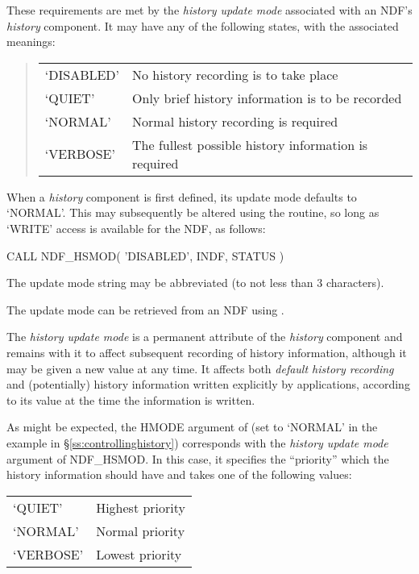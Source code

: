 \documentclass[twoside,11pt,nolof]{starlink}
\providecommand{\st}[1]{{\emph{#1}}}
\begin{document}
These requirements are met by the \st{history update mode\/} associated
with an NDF's \st{history\/} component. It may have any of the
following states, with the associated meanings:

\begin{quote}
\begin{center}
\begin{tabular}{ll}
`DISABLED' & No history recording is to take place\\
`QUIET' & Only brief history information is to be recorded\\
`NORMAL' & Normal history recording is required\\
`VERBOSE' & The fullest possible history information is required
\end{tabular}
\end{center}
\end{quote}

When a \st{history\/} component is first defined, its update mode
defaults to `NORMAL'. This may subsequently be altered using the
 routine, so long as `WRITE' access is available for the
NDF, as follows:

\small
\begin{terminalv}
      CALL NDF_HSMOD( 'DISABLED', INDF, STATUS )
\end{terminalv}
\normalsize

The update mode string may be abbreviated (to not less than 3 characters).

The update mode can be retrieved from an NDF using
.

The \st{history update mode\/} is a permanent attribute of the
\st{history\/} component and remains with it to affect subsequent
recording
of history information, although it may be given a new value at any
time.  It affects both \st{default history recording\/} and (potentially)
history information written explicitly by applications, according to
its value at the time the information is written.

As might be expected, the HMODE argument of  (set to `NORMAL'
in the example in \S\ref{ss:controllinghistory}) corresponds with the
\st{history update mode\/} argument of NDF\_HSMOD. In this case, it
specifies the ``priority'' which the history information should have
and takes one of the following values:

\begin{center}
\begin{tabular}{ll}
`QUIET' & Highest priority\\
`NORMAL' & Normal priority\\
`VERBOSE' & Lowest priority
\end{tabular}
\end{center}
\end{document}
